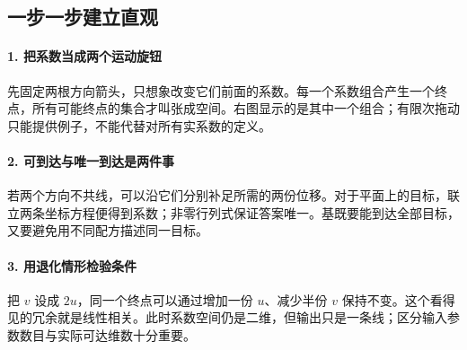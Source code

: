 \subsection*{一步一步建立直观}

\paragraph{1. 把系数当成两个运动旋钮}

先固定两根方向箭头，只想象改变它们前面的系数。每一个系数组合产生一个终点，所有可能终点的集合才叫张成空间。右图显示的是其中一个组合；有限次拖动只能提供例子，不能代替对所有实系数的定义。



\paragraph{2. 可到达与唯一到达是两件事}

若两个方向不共线，可以沿它们分别补足所需的两份位移。对于平面上的目标，联立两条坐标方程便得到系数；非零行列式保证答案唯一。基既要能到达全部目标，又要避免用不同配方描述同一目标。



\paragraph{3. 用退化情形检验条件}

把 $v$ 设成 $2u$，同一个终点可以通过增加一份 $u$、减少半份 $v$ 保持不变。这个看得见的冗余就是线性相关。此时系数空间仍是二维，但输出只是一条线；区分输入参数数目与实际可达维数十分重要。
